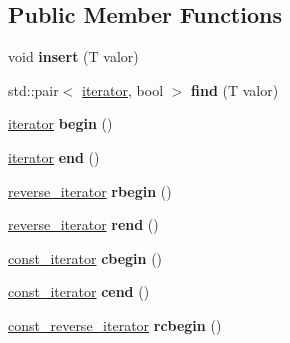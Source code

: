 \subsection*{Public Member Functions}
\begin{DoxyCompactItemize}
\item 
\hypertarget{classAVL_aa39147e36091d6271f8229590c6b0314}{void {\bfseries insert} (T valor)}\label{classAVL_aa39147e36091d6271f8229590c6b0314}

\item 
\hypertarget{classAVL_ae336b94fb3e39944ee3303d069ad4e1b}{std\-::pair$<$ \hyperlink{classAVL_1_1iterator}{iterator}, bool $>$ {\bfseries find} (T valor)}\label{classAVL_ae336b94fb3e39944ee3303d069ad4e1b}

\item 
\hypertarget{classAVL_a39b93e308526efae8721f852173bf96a}{\hyperlink{classAVL_1_1iterator}{iterator} {\bfseries begin} ()}\label{classAVL_a39b93e308526efae8721f852173bf96a}

\item 
\hypertarget{classAVL_a6e7311fcebdfc336ae24694c3026319c}{\hyperlink{classAVL_1_1iterator}{iterator} {\bfseries end} ()}\label{classAVL_a6e7311fcebdfc336ae24694c3026319c}

\item 
\hypertarget{classAVL_aa4e658ff0c0791b5751e4d8265c10a28}{\hyperlink{classAVL_1_1reverse__iterator}{reverse\-\_\-iterator} {\bfseries rbegin} ()}\label{classAVL_aa4e658ff0c0791b5751e4d8265c10a28}

\item 
\hypertarget{classAVL_a11312715cc9c72e3308f4b1f4f612e48}{\hyperlink{classAVL_1_1reverse__iterator}{reverse\-\_\-iterator} {\bfseries rend} ()}\label{classAVL_a11312715cc9c72e3308f4b1f4f612e48}

\item 
\hypertarget{classAVL_a4c1ddf2ba26ba43d3c435aa42fa5bd0f}{\hyperlink{classAVL_1_1const__iterator}{const\-\_\-iterator} {\bfseries cbegin} ()}\label{classAVL_a4c1ddf2ba26ba43d3c435aa42fa5bd0f}

\item 
\hypertarget{classAVL_a261570d592b2c5820ec714329b1cac9b}{\hyperlink{classAVL_1_1const__iterator}{const\-\_\-iterator} {\bfseries cend} ()}\label{classAVL_a261570d592b2c5820ec714329b1cac9b}

\item 
\hypertarget{classAVL_a6d79483a3dbc6b15a502bf7b1693b1d9}{\hyperlink{classAVL_1_1const__reverse__iterator}{const\-\_\-reverse\-\_\-iterator} {\bfseries rcbegin} ()}\label{classAVL_a6d79483a3dbc6b15a502bf7b1693b1d9}


\end{DoxyCompactItemize}
